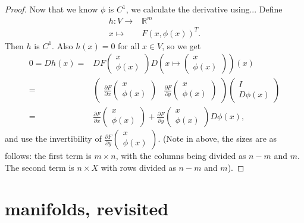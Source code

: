 \documentclass[12pt]{article}
\begin{document}
\begin{proof}
	Now that we know $\phi$ is $C^1$, we calculate the derivative using... Define 
	\begin{align*}
		h:V\to& \mathbb{R}^m \\
		x\mapsto& F(x,\phi(x))^T.
	\end{align*}
	Then $h$ is $C^1$. Also $h(x)=0$ for all $x\in V$, so we get 
	\begin{align*}
		0 = Dh(x) 
		=& DF\begin{pmatrix}x\\ \phi(x)\end{pmatrix} D(x\mapsto \begin{pmatrix}x\\\phi(x)\end{pmatrix})(x) \\
		=& \begin{pmatrix} \frac{\partial F}{\partial x}\begin{pmatrix}x\\ \phi(x)\end{pmatrix} & \frac{\partial F}{\partial y}\begin{pmatrix}x\\ \phi(x)\end{pmatrix} \end{pmatrix} \begin{pmatrix} I \\ D\phi(x) \end{pmatrix} \\
		=& \frac{\partial F}{\partial x}\begin{pmatrix}x\\ \phi(x)\end{pmatrix} + \frac{\partial F}{\partial y}\begin{pmatrix}x\\ \phi(x)\end{pmatrix}D\phi(x),
	\end{align*}
	and use the invertibility of $\frac{\partial F}{\partial y}\begin{pmatrix}x\\ \phi(x)\end{pmatrix}$. (Note in above, the sizes are as follows: the first term is $m\times n$, with the columns being divided as $n-m$ and $m$. The second term is $n\times X$ with rows divided as $n-m$ and $m$).
\end{proof}	


\section{manifolds, revisited} %
\end{document}

